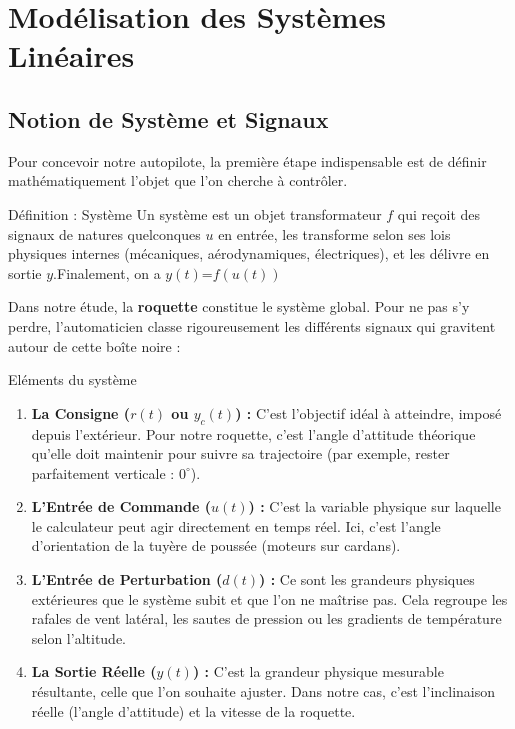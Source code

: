\documentclass[11pt,a4paper]{report}
\begin{document}
\chapter{Modélisation des Systèmes Linéaires}

\section{Notion de Système et Signaux}

Pour concevoir notre autopilote, la première étape indispensable est de définir mathématiquement l'objet que l'on cherche à contrôler.

\begin{defbox}{Définition : Système}
    Un système est un objet transformateur $f$ qui reçoit des signaux de natures quelconques $u$ en entrée, les transforme selon ses lois physiques internes (mécaniques, aérodynamiques, électriques), et les délivre en sortie $y$.Finalement, on a $y(t)$=$f(u(t))$
\end{defbox}

Dans notre étude, la \textbf{roquette} constitue le système global. Pour ne pas s'y perdre, l'automaticien classe rigoureusement les différents signaux qui gravitent autour de cette boîte noire :

\begin{defbox}{Eléments du système}
    \begin{enumerate}
    \item \textbf{La Consigne ($r(t)$ ou $y_c(t)$) :} C'est l'objectif idéal à atteindre, imposé depuis l'extérieur. Pour notre roquette, c'est l'angle d'attitude théorique qu'elle doit maintenir pour suivre sa trajectoire (par exemple, rester parfaitement verticale : $0^\circ$).
    \item \textbf{L'Entrée de Commande ($u(t)$) :} C'est la variable physique sur laquelle le calculateur peut agir directement en temps réel. Ici, c'est l'angle d'orientation de la tuyère de poussée (moteurs sur cardans).
    \item \textbf{L'Entrée de Perturbation ($d(t)$) :} Ce sont les grandeurs physiques extérieures que le système subit et que l'on ne maîtrise pas. Cela regroupe les rafales de vent latéral, les sautes de pression ou les gradients de température selon l'altitude.
    \item \textbf{La Sortie Réelle ($y(t)$) :} C'est la grandeur physique mesurable résultante, celle que l'on souhaite ajuster. Dans notre cas, c'est l'inclinaison réelle (l'angle d'attitude) et la vitesse de la roquette.
    \end{enumerate}
\end{defbox}
\end{document}
